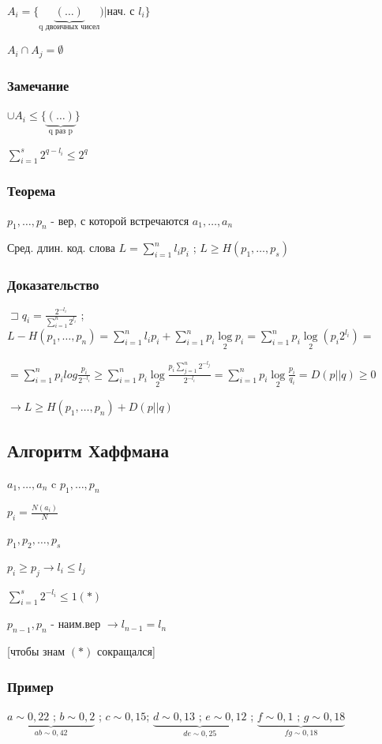 \documentclass[12pt]{article}
\begin{document}
$A_i=\{\underbrace{(\dots)}_{\text{q двоичных чисел}})|$нач. с $l_i\}$

$A_i\cap A_j=\emptyset$

\subsubsection{Замечание}
$\cup A_i \leq \{ \underbrace{(\dots)}_{\text{q раз p}}\}$

$\sum\limits_{i=1}^s 2^{q-l_i} \leq 2^q$
\subsubsection{Теорема}
$p_1,\dots, p_n$ - вер, с которой встречаются $a_1, \dots, a_n$

Сред. длин. код. слова $L = \sum\limits_{i=1}^n l_ip_i $ ; $L \geq H(p_1, \dots, p_s)$
\subsubsection{Доказательство}
$\sqsupset q_i=\frac{2^{-l_i}}{\sum\limits_{i=1}^n2^{l_i}}$ ; $L-H(p_1,\dots, p_n)=\sum\limits_{i=1}^nl_ip_i+\sum\limits_{i=1}^np_i\log\limits_2{p_i}=\sum\limits_{i=1}^np_i\log\limits_2(p_i2^{l_i})=$

$=\sum\limits_{i=1}^np_ilog{\frac{p_i}{2^{-l_i}}} \geq \sum\limits_{i=1}^np_i\log\limits_2{\frac{p_i\sum\limits_{j=1}^n2^{-l_j}}{2^{-l_i}}}=\sum\limits_{i=1}^np_i\log\limits_2{\frac{p_i}{q_i}}=D(p||q) \geq 0$

$\rightarrow L \geq H(p_1, \dots, p_n) + D(p||q)$
\subsection{Алгоритм Хаффмана}

$a_1, \dots, a_n$ c $p_1, \dots, p_n$

$p_i = \frac{N(a_i)}{N}$

$p_1, p_2, \dots, p_s$

$p_i \geq p_j \rightarrow l_i \leq l_j$

$\sum\limits_{i=1}^s 2^{-l_i} \leq 1 (*)$

$p_{n-1}, p_n$ - наим.вер $\rightarrow l_{n-1} = l_n$

[чтобы знам $(*)$ сокращался]
\subsubsection{Пример}
$\underbrace{a \sim 0,22 \text{ ; }b \sim 0,2}_{ab \sim 0,42}$ ; $c \sim 0,15$; $\underbrace{d \sim 0,13 \text{ ; }e \sim 0,12}_{de \sim 0,25}$ ; $\underbrace{f \sim 0,1\text{ ; } g \sim 0,18 }_{fg \sim 0,18}$
\end{document}
